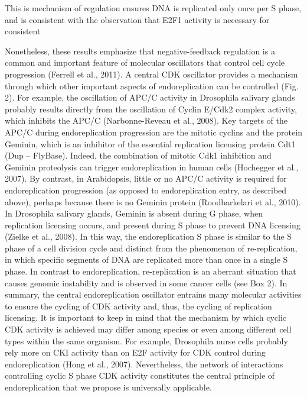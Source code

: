 \documentclass[11pt,twoside,a4paper]{report}
\begin{document}
				
				This is mechanism of regulation ensures DNA is replicated only once per S phase, and is consistent with the observation that E2F1 activity is necessary for 
				consistent 
			

			Nonetheless, these results emphasize that negative-feedback regulation is a common and important feature of molecular oscillators that control cell cycle progression (Ferrell et al., 2011). A central CDK oscillator provides a mechanism through which other important aspects of endoreplication can be controlled (Fig. 2). 
			For example, the oscillation of APC/C activity in Drosophila salivary glands probably results directly from the oscillation of Cyclin E/Cdk2 complex activity, which inhibits the APC/C (Narbonne-Reveau et al., 2008). Key targets of the APC/C during endoreplication progression are the mitotic cyclins and the protein Geminin, which is an inhibitor of the essential replication licensing protein Cdt1 (Dup – FlyBase).
			Indeed, the combination of mitotic Cdk1 inhibition and Geminin proteolysis can trigger endoreplication in human cells (Hochegger et al., 2007). By contrast, in Arabidopsis, little or no APC/C activity is required for endoreplication progression (as opposed to endoreplication entry, as described above), perhaps because there is no Geminin protein (Roodbarkelari et al., 2010). In Drosophila salivary glands, Geminin is absent during G phase, when replication licensing occurs, and present during S phase to prevent DNA licensing (Zielke et al., 2008).
			 In this way, the endoreplication S phase is similar to the S phase of a cell division cycle and distinct from the phenomenon of re-replication, in which specific segments of DNA are replicated more than once in a single S phase. In contrast to endoreplication, re-replication is an aberrant situation that causes genomic instability and is observed in some cancer cells (see Box 2).
			 In summary, the central endoreplication oscillator entrains many molecular activities to ensure the cycling of CDK activity and, thus, the cycling of replication licensing. It is important to keep in mind that the mechanism by which cyclic CDK activity is achieved may differ among species or even among different cell types within the same organism. For example, Drosophila nurse cells probably rely more on CKI activity than on E2F activity for CDK control during endoreplication (Hong et al., 2007). Nevertheless, the network of interactions controlling cyclic S phase CDK activity constitutes the central principle of endoreplication that we propose is universally applicable.
\end{document}
